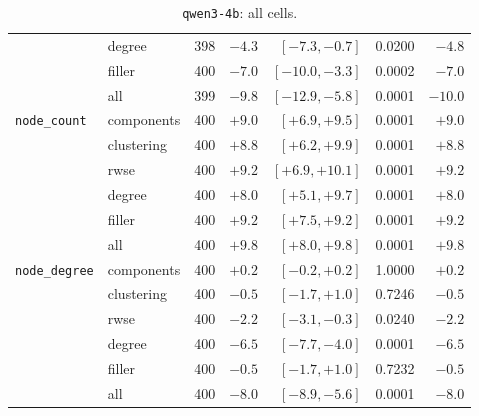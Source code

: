 \begin{table}[H]
{\begin{tabular}{llrrrrr}
 & degree & 398 & $-4.3$ & $[-7.3, -0.7]$ & 0.0200 & $-4.8$ \\
 & filler & 400 & $-7.0$ & $[-10.0, -3.3]$ & 0.0002 & $-7.0$ \\
 & all & 399 & $-9.8$ & $[-12.9, -5.8]$ & 0.0001 & $-10.0$ \\
\midrule
\texttt{node\_count} & components & 400 & $+9.0$ & $[+6.9, +9.5]$ & 0.0001 & $+9.0$ \\
 & clustering & 400 & $+8.8$ & $[+6.2, +9.9]$ & 0.0001 & $+8.8$ \\
 & rwse & 400 & $+9.2$ & $[+6.9, +10.1]$ & 0.0001 & $+9.2$ \\
 & degree & 400 & $+8.0$ & $[+5.1, +9.7]$ & 0.0001 & $+8.0$ \\
 & filler & 400 & $+9.2$ & $[+7.5, +9.2]$ & 0.0001 & $+9.2$ \\
 & all & 400 & $+9.8$ & $[+8.0, +9.8]$ & 0.0001 & $+9.8$ \\
\midrule
\texttt{node\_degree} & components & 400 & $+0.2$ & $[-0.2, +0.2]$ & 1.0000 & $+0.2$ \\
 & clustering & 400 & $-0.5$ & $[-1.7, +1.0]$ & 0.7246 & $-0.5$ \\
 & rwse & 400 & $-2.2$ & $[-3.1, -0.3]$ & 0.0240 & $-2.2$ \\
 & degree & 400 & $-6.5$ & $[-7.7, -4.0]$ & 0.0001 & $-6.5$ \\
 & filler & 400 & $-0.5$ & $[-1.7, +1.0]$ & 0.7232 & $-0.5$ \\
 & all & 400 & $-8.0$ & $[-8.9, -5.6]$ & 0.0001 & $-8.0$ \\
\bottomrule
\end{tabular}}
\caption{\texttt{qwen3-4b}: all cells.}
\end{table}

